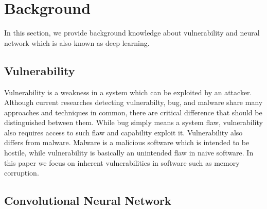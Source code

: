 \section{Background}

In this section, we provide background knowledge about vulnerability and neural network which is also known as deep learning.

\subsection{Vulnerability}

Vulnerability is a weakness in a system which can be exploited by an attacker.
Although current researches detecting vulnerabilty, bug, and malware share many approaches and techniques in common,
there are critical difference that should be distinguished between them.
While bug simply means a system flaw, vulnerability also requires access to such flaw and capability exploit it.
Vulnerability also differs from malware. Malware is a malicious software which is intended to be hostile,
while vulnerability is basically an unintended flaw in naive software.
In this paper we focus on inherent vulnerabilities in software such as memory corruption.

\subsection{Convolutional Neural Network}